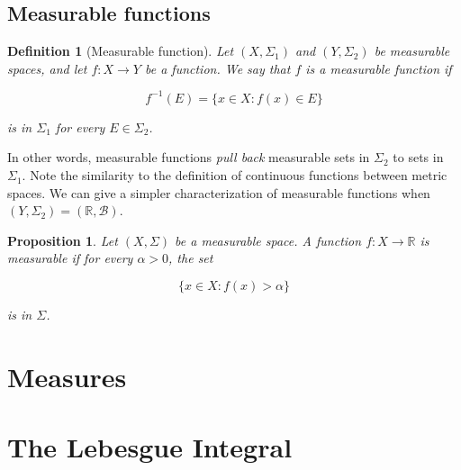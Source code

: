 \documentclass{amsart}
\newcommand{\bbR}{\mathbb{R}}
\newcommand{\Borel}{\mathcal{B}}
\newtheorem{proposition}[theorem]{Proposition}
\newtheorem{definition}[theorem]{Definition}
\begin{document}
\bigskip

\subsection{Measurable functions}


\begin{definition}[Measurable function]\label{def:measurable-fn}
    Let $(X, \Sigma_1)$ and $(Y, \Sigma_2)$ be measurable spaces, and let $f:X
    \rightarrow Y$ be a function. We say that $f$ is a measurable function if 

    $$ f^{-1}(E) = \{x \in X : f(x) \in E \}  $$

    is in $\Sigma_1$ for every $E \in \Sigma_2$.
\end{definition}

In other words, measurable functions \textit{pull back} measurable sets in
$\Sigma_2$ to sets in $\Sigma_1$. Note the similarity to the definition of
continuous functions between metric spaces. We can give a simpler characterization of
measurable functions when $(Y, \Sigma_2) = (\bbR, \Borel)$. 

\begin{proposition}\label{prop:measurable-fn-r}
    Let $(X, \Sigma)$ be a measurable space. A function $f:X \rightarrow \bbR$
    is measurable if for every $\alpha > 0$, the set

    $$\{x \in X : f(x) > \alpha \}$$

    is in $\Sigma$.
\end{proposition}


\newpage

\section{Measures}

\newpage

\section{The Lebesgue Integral}
\end{document}
